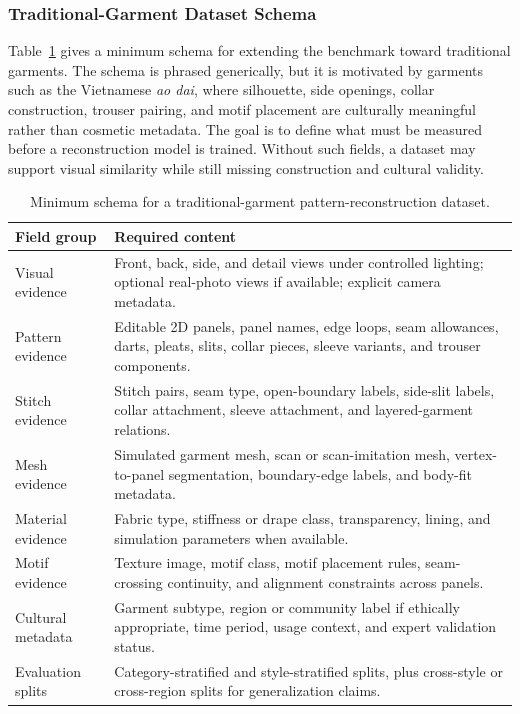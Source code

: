 \documentclass[pdflatex,sn-mathphys-num]{sn-jnl}
\begin{document}
\subsubsection{Traditional-Garment Dataset Schema}\label{sec:traditionalschema}

Table~\ref{tab:traditionalschema} gives a minimum schema for extending the benchmark toward traditional garments. The schema is phrased generically, but it is motivated by garments such as the Vietnamese \textit{ao dai}, where silhouette, side openings, collar construction, trouser pairing, and motif placement are culturally meaningful rather than cosmetic metadata. The goal is to define what must be measured before a reconstruction model is trained. Without such fields, a dataset may support visual similarity while still missing construction and cultural validity.

\begin{table}[!htbp]
\caption{Minimum schema for a traditional-garment pattern-reconstruction dataset.}\label{tab:traditionalschema}
\centering
\begin{tabular}{p{}p{}}
\toprule
Field group & Required content \\
\midrule
Visual evidence & Front, back, side, and detail views under controlled lighting; optional real-photo views if available; explicit camera metadata. \\
Pattern evidence & Editable 2D panels, panel names, edge loops, seam allowances, darts, pleats, slits, collar pieces, sleeve variants, and trouser components. \\
Stitch evidence & Stitch pairs, seam type, open-boundary labels, side-slit labels, collar attachment, sleeve attachment, and layered-garment relations. \\
Mesh evidence & Simulated garment mesh, scan or scan-imitation mesh, vertex-to-panel segmentation, boundary-edge labels, and body-fit metadata. \\
Material evidence & Fabric type, stiffness or drape class, transparency, lining, and simulation parameters when available. \\
Motif evidence & Texture image, motif class, motif placement rules, seam-crossing continuity, and alignment constraints across panels. \\
Cultural metadata & Garment subtype, region or community label if ethically appropriate, time period, usage context, and expert validation status. \\
Evaluation splits & Category-stratified and style-stratified splits, plus cross-style or cross-region splits for generalization claims. \\
\bottomrule
\end{tabular}
\end{table}
\end{document}
